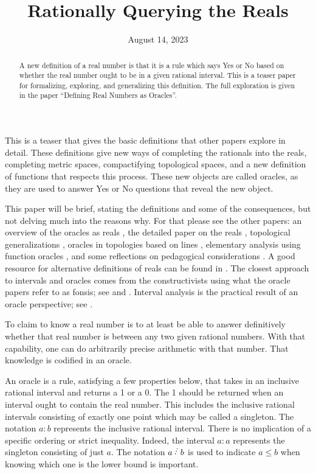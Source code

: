 \documentclass[12pt]{article}
\title{Rationally Querying the Reals}
\date{August 14, 2023}
\begin{document}
\maketitle
\begin{abstract}
A new definition of a real number is that it is a rule which says Yes or No based on whether the real number ought to be in a given rational interval. This is a teaser paper for formalizing, exploring, and generalizing this definition. The full exploration is given in the paper ``Defining Real Numbers as Oracles''. 
\end{abstract}

This is a teaser that gives the basic definitions that other papers explore in detail. These definitions give new ways of completing the rationals into the reals, completing metric spaces, compactifying topological spaces, and a new definition of functions that respects this process. These new objects are called oracles, as they are used to answer Yes or No questions that reveal the new object. 

This paper will be brief, stating the definitions and some of the consequences, but not delving much into the reasons why. For that please see the other papers: an overview of the oracles as reals \cite{taylor23over}, the detailed paper on the reals \cite{taylor23main}, topological generalizations \cite{taylor23metric}, oracles in topologies based on lines \cite{taylor23maudlin}, elementary analysis using function oracles \cite{taylor23funora}, and some reflections on pedagogical considerations \cite{taylor23edu}. A good resource for alternative definitions of reals can be found in \cite{ittay-2015}. The closest approach to intervals and oracles comes from the constructivists using what the oracle papers refer to as fonsis; see \cite{bridger} and \cite{bridges}.  Interval analysis is the practical result of an oracle perspective; see \cite{moore}.

To claim to know a real number is to at least be able to answer definitively whether that real number is between any two given rational numbers. With that capability, one can do arbitrarily precise arithmetic with that number. That knowledge is codified in an oracle. 


An oracle is a rule, satisfying a few properties below, that takes in an inclusive rational interval and returns a 1 or a 0. The 1 should be returned when an interval ought to contain the real number. This includes the inclusive rational intervals consisting of exactly one point which may be called a singleton. The notation $a:b$ represents the inclusive rational interval. There is no implication of a specific ordering or strict inequality.  Indeed, the  interval $a:a$ represents the singleton consisting of just $a$. The notation $a\lte b$ is used to indicate $a\leq b$ when knowing which one is the lower bound is important. 
\end{document}
